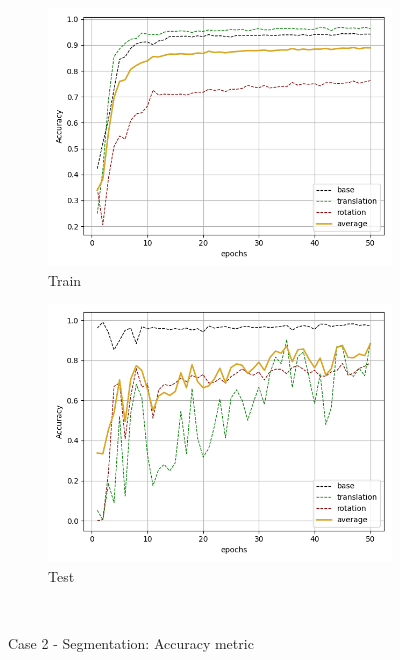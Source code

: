 \begin{figure}[H]
    \begin{subfigure}{.48\linewidth}
    \centering
    \includegraphics[scale=0.45]{Img/seg_noise_train_acc.png}
    \caption{Train}
    \end{subfigure}
    \begin{subfigure}{.48\linewidth}
    \centering
    \includegraphics[scale=0.45]{Img/seg_noise_test_acc.png}
    \caption{Test}
    \end{subfigure}\\
    \caption{Case 2 - Segmentation: Accuracy metric}
    \label{fig:seg_noise_acc}
\end{figure}
